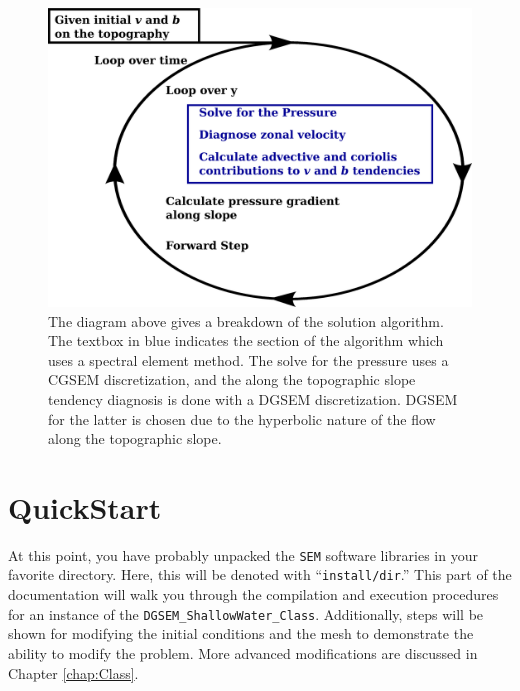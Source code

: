 \documentclass[12pt]{memoir}
\begin{document}
\begin{figure}[h!]
\begin{center}
\includegraphics[scale=0.225]{images/topomods/algorithm.eps}
\caption{The diagram above gives a breakdown of the solution algorithm. The textbox in blue indicates the section of the algorithm which uses a spectral element method. The solve for the pressure uses a CGSEM discretization, and the along the topographic slope tendency diagnosis is done with a DGSEM discretization. DGSEM for the latter is chosen due to the hyperbolic nature of the flow along the topographic slope.}\label{fig:algorithm}
\end{center}
\end{figure}

\chapter{QuickStart}


At this point, you have probably unpacked the \texttt{SEM} software libraries in your favorite directory. Here, this will be denoted with ``\texttt{install/dir}.'' This part of the documentation will walk you through the compilation and execution procedures for an instance of the \texttt{DGSEM\_ShallowWater\_Class}. Additionally, steps will be shown for modifying the initial conditions and the mesh to demonstrate the ability to modify the problem. More advanced modifications are discussed in Chapter \ref{chap:Class}. \\
\end{document}
